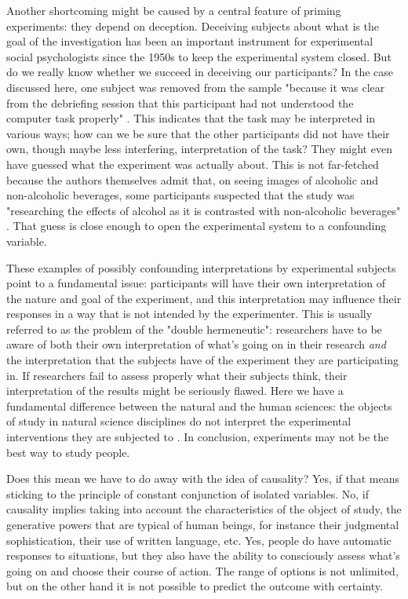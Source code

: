 \documentclass[twocolumn, serif, authordate, reflection]{jote-article}
\begin{document}
Another shortcoming might be caused by a central feature of priming experiments: they depend on deception. Deceiving subjects about what is the goal of the investigation has been an important instrument for experimental social psychologists since the 1950s to keep the experimental system closed. But do we really know whether we succeed in deceiving our participants? In the case discussed here, one subject was removed from the sample "because it was clear from the debriefing session that this participant had not understood the computer task properly"  \parencite[p. 11]{Leboeuf2020}. This indicates that the task may be interpreted in various ways; how can we be sure that the other participants did not have their own, though maybe less interfering, interpretation of the task? They might even have guessed what the experiment was actually about. This is not far-fetched because the authors themselves admit that, on seeing images of alcoholic and non-alcoholic beverages, some participants suspected that the study was "researching the effects of alcohol as it is contrasted with non-alcoholic beverages"  \parencite[p. 14]{Leboeuf2020}. That guess is close enough to open the experimental system to a confounding variable.

These examples of possibly confounding interpretations by experimental subjects point to a fundamental issue: participants will have their own interpretation of the nature and goal of the experiment, and this interpretation may influence their responses in a way that is not intended by the experimenter. This is usually referred to as the problem of the "double hermeneutic": researchers have to be aware of both their own interpretation of what’s going on in their research \textit{and }the interpretation that the subjects have of the experiment they are participating in. If researchers fail to assess properly what their subjects think, their interpretation of the results might be seriously flawed. Here we have a fundamental difference between the natural and the human sciences: the objects of study in natural science disciplines do not interpret the experimental interventions they are subjected to \parencite{Radder2019}. In conclusion, experiments may not be the best way to study people.

Does this mean we have to do away with the idea of causality? Yes, if that means sticking to the principle of constant conjunction of isolated variables. No, if causality implies taking into account the characteristics of the object of study, the generative powers that are typical of human beings, for instance their judgmental sophistication, their use of written language, etc. Yes, people do have automatic responses to situations, but they also have the ability to consciously assess what’s going on and choose their course of action. The range of options is not unlimited, but on the other hand it is not possible to predict the outcome with certainty. 
\end{document}
